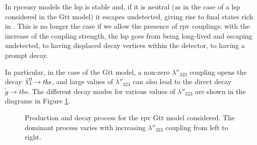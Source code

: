 In \gls{rpcsusy} models the \gls{lsp} is stable and, if it is neutral (as in the case of a \ninoone \gls{lsp} 
considered in the Gtt model) it escapes undetected, giving rise to final states rich in \met. 
This is no longer the case if we allow the presence of \gls{rpv} couplings: with the increase of the 
coupling strength, the \gls{lsp} goes from being 
long-lived and escaping undetected, to having displaced decay vertices within the detector, to  
having a prompt decay. 

In particular, in the case of the Gtt model, a non-zero $\lambda''_{323}$ coupling opens the decay 
$\ninoone \rightarrow t b s$, and large values  of $\lambda''_{323}$ can also lead to the 
direct decay $\tilde{g} \rightarrow t b s$. The different decay modes for various values of  
$\lambda''_{323}$ are shown in the diagrams in Figure \ref{fig:rpcrpv_diagrams}.
 

\begin{figure}[htbp]
	\centering 
	\caption{Production and decay process for the \gls{rpv} Gtt model considered.
	 The dominant process varies with increasing $\lambda''_{323}$ coupling from left to right.}
	\label{fig:rpcrpv_diagrams}
\end{figure}

